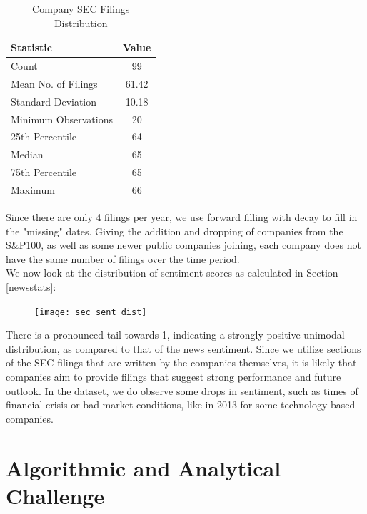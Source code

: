 \begin{table}[htbp]
    \centering
    \caption{Company SEC Filings Distribution}
    \begin{tabular}{l c}
        \toprule
        \textbf{Statistic} & \textbf{Value} \\
        \midrule
        Count & 99 \\
        Mean No. of Filings & 61.42 \\
        Standard Deviation & 10.18 \\
        Minimum Observations & 20 \\
        25th Percentile & 64 \\
        Median & 65 \\
        75th Percentile & 65 \\
        Maximum & 66 \\
        \bottomrule
    \end{tabular}
\end{table}
Since there are only 4 filings per year, we use forward filling with decay to fill in the "missing" dates. Giving the addition and dropping of companies from the S&P100, as well as some newer public companies joining, each company does not have the same number of filings over the time period.\\
We now look at the distribution of sentiment scores as calculated in Section \ref{newsstats}:

\begin{figure}[H]
\texttt{[image: sec\_sent\_dist]}
\end{figure}

There is a pronounced tail towards 1, indicating a strongly positive unimodal distribution, as compared to that of the news sentiment. Since we utilize sections of the SEC filings that are written by the companies themselves, it is likely that companies aim to provide filings that suggest strong performance and future outlook. In the dataset, we do observe some drops in sentiment, such as times of financial crisis or bad market conditions, like in 2013 for some technology-based companies.

\section{Algorithmic and Analytical Challenge}

